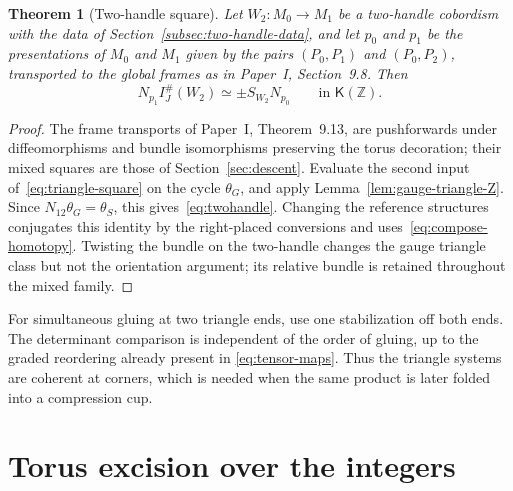 \documentclass[11pt]{amsart}
\newtheorem{theorem}{Theorem}[section]
\theoremstyle{definition}
\theoremstyle{remark}
\theoremstyle{plain}
\numberwithin{equation}{section}
\newcommand{\ZZ}{\mathbb Z}
\newcommand{\cK}{\mathsf K}
\newcommand{\IG}{I^{\#}_{J}}
\begin{document}
\begin{theorem}[Two-handle square]\label{thm:two-handle}
Let $W_2\colon M_0\to M_1$ be a two-handle cobordism with the data of
Section~\ref{subsec:two-handle-data}, and let $p_0$ and $p_1$ be the
presentations of $M_0$ and $M_1$ given by the pairs $(P_0,P_1)$ and
$(P_0,P_2)$, transported to the global frames as in Paper~I,
Section~9.8. Then
\begin{equation}\label{eq:twohandle}
 N_{p_1}\IG(W_2)\simeq\pm S_{W_2}N_{p_0}\qquad\text{in }\cK(\ZZ).
\end{equation}
\end{theorem}
\begin{proof}
The frame transports of Paper~I, Theorem~9.13, are pushforwards under
diffeomorphisms and bundle isomorphisms preserving the torus decoration;
their mixed squares are those of Section~\ref{sec:descent}. Evaluate the
second input of~\eqref{eq:triangle-square} on the cycle $\theta_G$, and
apply Lemma~\ref{lem:gauge-triangle-Z}. Since $N_{12}\theta_G=\theta_S$,
this gives~\eqref{eq:twohandle}. Changing the reference structures
conjugates this identity by the right-placed conversions and
uses~\eqref{eq:compose-homotopy}. Twisting the bundle on the two-handle
changes the gauge triangle class but not the orientation argument; its
relative bundle is retained throughout the mixed family.
\end{proof}

For simultaneous gluing at two triangle ends, use
one stabilization off both ends. The determinant
comparison is independent of the order of gluing,
up to the graded reordering already present in
\eqref{eq:tensor-maps}. Thus the triangle systems
are coherent at corners, which is needed when the
same product is later folded into a compression cup.

\section{Torus excision over the integers}\label{sec:excision}
\end{document}

